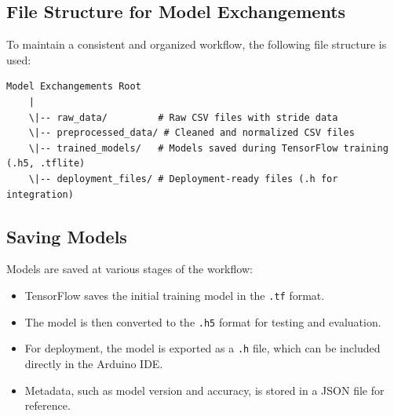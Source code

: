 \subsection{File Structure for Model Exchangements}

To maintain a consistent and organized workflow, the following file structure is used:
\begin{lstlisting}[basicstyle=\ttfamily, frame=single]
	Model Exchangements Root
	|
	\|-- raw_data/         # Raw CSV files with stride data
	\|-- preprocessed_data/ # Cleaned and normalized CSV files
	\|-- trained_models/   # Models saved during TensorFlow training (.h5, .tflite)
	\|-- deployment_files/ # Deployment-ready files (.h for integration)
\end{lstlisting}

\subsection{Saving Models}
Models are saved at various stages of the workflow:
\begin{itemize}
	\item TensorFlow saves the initial training model in the \texttt{.tf} format.
	\item The model is then converted to the \texttt{.h5} format for testing and evaluation.
	\item For deployment, the model is exported as a \texttt{.h} file, which can be included directly in the Arduino IDE.
	\item Metadata, such as model version and accuracy, is stored in a JSON file for reference.
\end{itemize}

